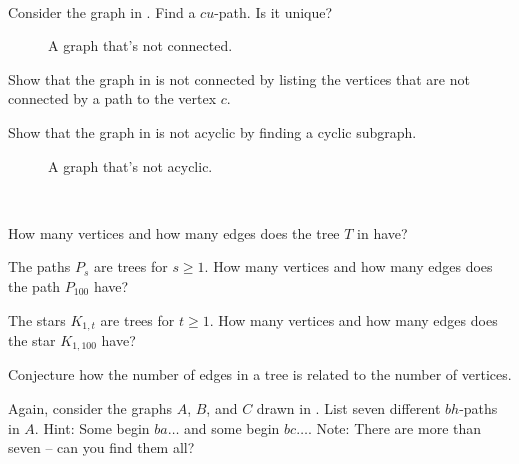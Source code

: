 \begin{exer}[\exerP] %
\label{exer_not_trees}
~
    \begin{exerpart}
        \item Consider the graph in .  Find a $cu$-path.  Is it unique?
            \begin{figure}[hbtp]
                \centering
                
                \caption{A graph that's not connected.}
                \label{fig_twisted_disconnected}
            \end{figure}
        \item Show that the graph in  is not connected by listing the vertices that are not connected by a path to the vertex $c$.
        \item Show that the graph in  is not acyclic by finding a cyclic subgraph.
            \begin{figure}[hbtp]
                \centering
                
                \caption{A graph that's not acyclic.}
                \label{fig_twisted_cycle}
            \end{figure}
    \end{exerpart}
\end{exer} 

\begin{exer}[\exerU] %
\label{exer_size_trees}
~
    \begin{exerpart}
        \item How many vertices and how many edges does the tree $T$ in  have? 
        \item The paths $P_s$ are trees for $s \ge 1$.  How many vertices and how many edges does the path $P_{100}$ have?  
        \item The stars $K_{1,t}$ are trees for $t \ge 1$.  How many vertices and how many edges does the star $K_{1,100}$ have?
        \item Conjecture how the number of edges in a tree is related to the number of vertices.      
    \end{exerpart}
\end{exer} 

\begin{exer}[\exerU] %
\label{exer_path_subgraphs}
    Again, consider the graphs $A$, $B$, and $C$ drawn in .  List seven different $bh$-paths in $A$. Hint: Some begin $ba\ldots$ and some begin $bc\ldots$. Note: There are more than seven -- can you find them all?
\end{exer} 

